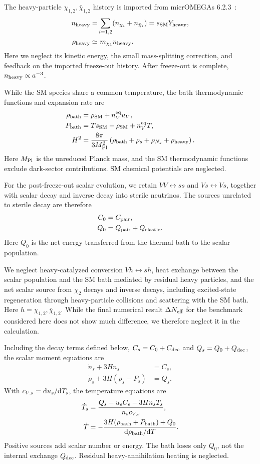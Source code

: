 \documentclass[prd,showpacs,preprintnumbers,amsmath,amssymb,twocolumn,
superscriptaddress,notitlepage]{revtex4-2}
\begin{document}
The heavy-particle $\chi_{1,2}, \bar\chi_{1,2}$ history is imported from
micrOMEGAs 6.2.3~\cite{Alguero:2023zol}:
\begin{align}
n_{\rm heavy}
=&\sum_{i=1,2}(n_{\chi_i}+n_{\bar\chi_i})
=s_{\rm SM}Y_{\rm heavy},\\
\rho_{\rm heavy}\simeq & \,\,m_{\chi_1}n_{\rm heavy}.
\end{align}
Here we neglect its kinetic energy, the small mass-splitting
correction, and feedback on the imported freeze-out history.
After freeze-out is complete, $n_{\rm heavy}\propto a^{-3}$.

While the SM species share a common temperature, the bath
thermodynamic functions and expansion rate are
\begin{align}
\rho_{\rm bath}
&=\rho_{\rm SM}+n_V^{\rm eq}u_V,
\\
P_{\rm bath}
&=Ts_{\rm SM}-\rho_{\rm SM}+n_V^{\rm eq}T,
\\
H^2
&=\frac{8\pi}{3M_{\rm Pl}^2}
\left(\rho_{\rm bath}+\rho_s+\rho_{N_s}+\rho_{\rm heavy}\right).
\end{align}
Here $M_{\rm Pl}$ is the unreduced Planck mass, and the SM
thermodynamic functions exclude dark-sector contributions.
SM chemical potentials are neglected.

For the post-freeze-out scalar evolution, we retain
$VV\leftrightarrow ss$ and $Vs\leftrightarrow Vs$, together
with scalar decay and inverse decay into sterile neutrinos.
The sources unrelated to sterile decay are therefore
\begin{align}
C_0 &= C_{\rm pair},\\
Q_0 &= Q_{\rm pair}+Q_{\rm elastic}.
\end{align}
Here $Q_0$ is the net energy transferred from the thermal
bath to the scalar population.

We neglect heavy-catalyzed conversion $Vh\leftrightarrow sh$,
heat exchange between the scalar population and the SM bath
mediated by residual heavy particles, and the net scalar
source from $\chi_2$ decays and inverse decays, including
excited-state regeneration through heavy-particle collisions
and scattering with the SM bath.
Here $h=\chi_{1,2},\bar\chi_{1,2}$.
While the final numerical result $\Delta N_{\rm eff}$ for the benchmark considered here does not show much difference, we therefore neglect it in the calculation.

Including the decay terms defined below,
$C_s=C_0+C_{\rm dec}$ and $Q_s=Q_0+Q_{\rm dec}$,
the scalar moment equations are~\cite{EscuderoAbenza:2020cmq}
\begin{align}
\dot n_s+3Hn_s&=C_s,
\\
\dot\rho_s+3H(\rho_s+P_s)&=Q_s.
\end{align}
With $c_{V,s}={\rm d}u_s/{\rm d}T_s$, the temperature equations
are
\begin{align}
\dot T_s
&=\frac{Q_s-u_sC_s-3Hn_sT_s}{n_sc_{V,s}},
\\
\dot T
&=-\frac{3H(\rho_{\rm bath}+P_{\rm bath})+Q_0}
{{\rm d}\rho_{\rm bath}/{\rm d}T}.
\end{align}
Positive sources add scalar number or energy. The bath
loses only $Q_0$, not the internal exchange $Q_{\rm dec}$.
Residual heavy-annihilation heating is neglected.
\end{document}
